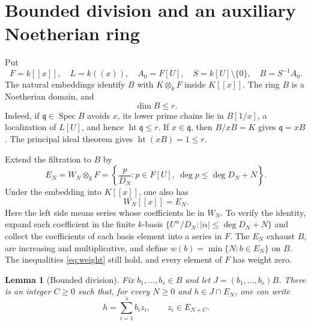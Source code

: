\documentclass[11pt,reqno]{amsart}
\numberwithin{equation}{section}
\theoremstyle{plain}
\newtheorem{lemma}[theorem]{Lemma}
\theoremstyle{definition}
\theoremstyle{remark}
\DeclareMathOperator{\Spec}{Spec}
\DeclareMathOperator{\height}{ht}
\newcommand{\q}{\mathfrak q}
\begin{document}
\section{Bounded division and an auxiliary Noetherian ring}
\label{sec:division}

Put
\begin{equation}\label{eq:B}
 F=k[[x]],\quad L=k((x)),\quad A_0=F[U],\quad
 S=k[U]\setminus\{0\},\quad B=S^{-1}A_0.
\end{equation}
The natural embeddings identify $B$ with $K\otimes_kF$ inside
$K[[x]]$. The ring $B$ is a Noetherian domain, and
\begin{equation}\label{eq:Bdim}
 \dim B\le r.
\end{equation}
Indeed, if $\q\in\Spec B$ avoids $x$, its lower prime chains lie
in $B[1/x]$, a localization of $L[U]$, and hence $\height\q\le r$.
If $x\in\q$, then $B/xB=K$ gives $\q=xB$. The principal ideal
theorem gives $\height(xB)=1\le r$.

Extend the filtration to $B$ by
\begin{equation}\label{eq:E}
 E_N=W_N\otimes_kF
 =\left\{\frac{p}{D_N}:p\in F[U],\
                    \deg p\le\deg D_N+N\right\}.
\end{equation}
Under the embedding into $K[[x]]$, one also has
\begin{equation}\label{eq:finite-basis}
 W_N[[x]]=E_N.
\end{equation}
Here the left side means series whose coefficients lie in $W_N$.
To verify the identity, expand each coefficient in the finite
$k$-basis $\{U^\alpha/D_N:|\alpha|\le\deg D_N+N\}$ and collect
the coefficients of each basis element into a series in $F$.
The $E_N$ exhaust $B$, are increasing and multiplicative, and define
$w(b)=\min\{N:b\in E_N\}$ on $B$. The inequalities
\eqref{eq:weight} still hold, and every element of $F$ has weight zero.

\begin{lemma}[Bounded division]\label{lem:division}
Fix $b_1,\ldots,b_s\in B$ and let $J=(b_1,\ldots,b_s)B$.
There is an integer $C\ge0$ such that, for every $N\ge0$ and
$h\in J\cap E_N$, one can write
\begin{equation}\label{eq:division}
 h=\sum_{i=1}^{s}b_i z_i,\qquad z_i\in E_{N+C}.
\end{equation}
\end{lemma}
\end{document}

